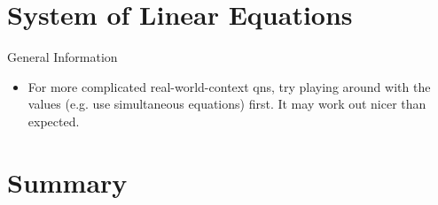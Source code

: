 \documentclass[oneside]{book}
\begin{document}
\section{System of Linear Equations}
\begin{stbox}{General Information}
  \begin{itemize}
    \item  For more complicated real-world-context qns, try playing around with the values (e.g. use simultaneous equations) first. It may work out nicer than expected.
  \end{itemize}
\end{stbox}
\section{Summary}
\end{document}
